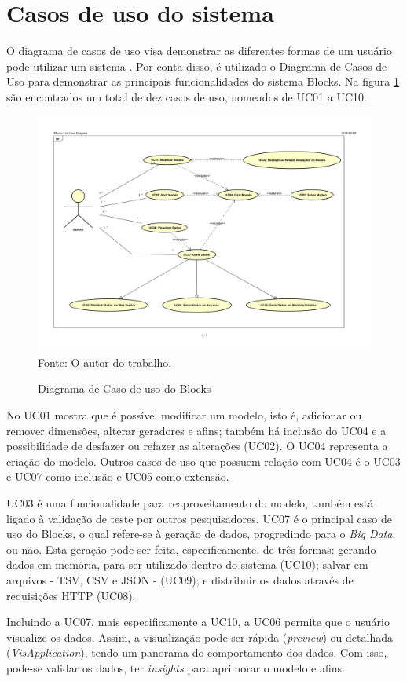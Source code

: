 \documentclass[
	12pt,				%
	openright,			%
	oneside,			%
	a4paper,			%
	english,			%
	brazil				%
	]{abntex2}
\begin{document}
	\section{Casos de uso do sistema}
		O diagrama de casos de uso visa demonstrar as diferentes formas de um usuário pode utilizar um sistema \cite{UCdefinition}.
		Por conta disso, é utilizado o Diagrama de Casos de Uso para demonstrar as principais funcionalidades do sistema Blocks.
		Na figura \ref{fig:diagramaUC} são encontrados um total de dez casos de uso, nomeados de UC01 a UC10.
		\begin{figure}[h!]
			\centering
			\caption{Diagrama de Caso de uso do Blocks}
			\includegraphics[width=\linewidth]{./figures/prototipo/diagramaUC.png}
			\label{fig:diagramaUC}
			\footnotesize Fonte: O autor do trabalho.
		\end{figure}
		\par
		No UC01 mostra que é possível modificar um modelo, isto é, adicionar ou remover dimensões, alterar geradores e afins; também há inclusão do UC04 e a possibilidade de desfazer ou refazer as alterações (UC02).
		O UC04 representa a criação do modelo.
		Outros casos de uso que possuem relação com UC04 é o UC03 e UC07 como inclusão e UC05 como extensão.
		\par
		UC03 é uma funcionalidade para reaproveitamento do modelo, também está ligado à validação de teste por outros pesquisadores.
		UC07 é o principal caso de uso do Blocks, o qual refere-se à geração de dados, progredindo para o \emph{Big Data} ou não.
		Esta geração pode ser feita, especificamente, de três formas: gerando dados em memória, para ser utilizado dentro do sistema (UC10);
			salvar em arquivos - TSV, CSV e JSON - (UC09);
			e distribuir os dados através de requisições HTTP (UC08).
		\par
		Incluindo a UC07, mais especificamente a UC10, a UC06 permite que o usuário visualize os dados. 
		Assim, a visualização pode ser rápida (\emph{preview}) ou detalhada (\emph{VisApplication}), tendo um panorama do comportamento dos dados. 
		Com isso, pode-se validar os dados, ter \emph{insights} para aprimorar o modelo e afins.
\end{document}
